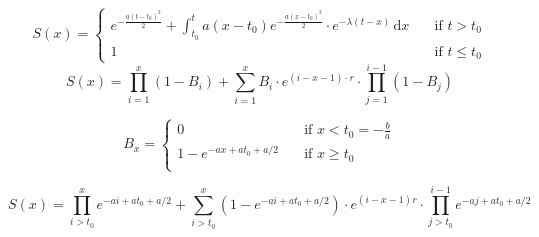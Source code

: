\documentclass{article}
\begin{document}
\begin{equation}
S(x) = 
   \begin{cases}
      e^{-\frac{a(t-t_0)^2}{2}} + \int_{t_0}^t a(x - t_0)e^{-\frac{a(x-t_0)^2}{2}}\cdot e^{-\lambda (t-x)}\,\mathrm{d}x & \quad \text{if } t > t_0\\
      1 & \quad \text{if } t \leq t_0
   \end{cases}
\end{equation}
\begin{equation}
S(x) = \prod_{i=1}^x (1-B_i) + \sum_{i=1}^x B_i \cdot e^{(i-x-1)\cdot r} \cdot \prod_{j=1}^{i-1} (1-B_j)
\end{equation}

\[ B_x = 
   \begin{cases}
      0 & \quad \text{if } x < t_0 = -\frac{b}{a}\\
      1 - e^{-ax + at_0 + a/2} & \quad \text{if } x \geq t_0\\
   \end{cases}
\]

\begin{equation}
S(x) = \prod_{i>t_0}^x e^{-ai+at_0+a/2} + \sum_{i>t_0}^x (1-e^{-ai+at_0+a/2})\cdot e^{(i-x-1)r} \cdot \prod_{j>t_0}^{i-1}e^{-aj+at_0+a/2}
\end{equation}
\end{document}
